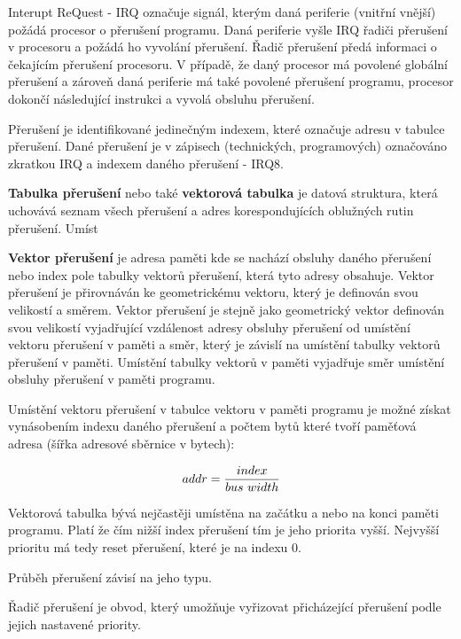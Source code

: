 Interupt ReQuest - IRQ označuje signál, kterým daná periferie (vnitřní vnější) požádá procesor o přerušení programu. Daná periferie vyšle IRQ řadiči přerušení v procesoru a požádá ho vyvolání přerušení. Řadič přerušení předá informaci o čekajícím přerušení procesoru. V případě, že daný procesor má povolené globální přerušení a zároveň daná periferie má také povolené přerušení programu, procesor dokončí následující instrukci a vyvolá obsluhu přerušení. 

Přerušení je identifikované jedinečným indexem, které označuje adresu v tabulce přerušení. Dané přerušení je v zápisech (technických, programových) označováno zkratkou IRQ a indexem daného přerušení - IRQ8.


{\bf Tabulka přerušení} nebo také {\bf vektorová tabulka} je datová struktura, která uchovává seznam všech přerušení a adres korespondujících oblužných rutin přerušení. Umíst

{\bf Vektor přerušení} je adresa paměti kde se nachází obsluhy daného přerušení nebo index pole tabulky vektorů přerušení, která tyto adresy obsahuje. Vektor přerušení je přirovnáván ke geometrickému vektoru, který je definován svou velikostí a směrem. Vektor přerušení je stejně jako geometrický vektor definován svou velikostí vyjadřující vzdálenost adresy obsluhy přerušení od umístění vektoru přerušení v paměti a směr, který je závislí na umístění tabulky vektorů přerušení v paměti. Umístění tabulky vektorů v paměti vyjadřuje směr umístění obsluhy přerušení v paměti programu.

Umístění vektoru přerušení v tabulce vektoru v paměti programu je možné získat vynásobením indexu daného přerušení a počtem bytů které tvoří paměťová adresa (šířka adresové sběrnice v bytech):
 
$$ addr = {index \over bus~width}$$


Vektorová tabulka bývá nejčastěji umístěna na začátku a nebo na konci paměti programu. Platí že čím nižší index přerušení tím je jeho priorita vyšší. Nejvyšší prioritu má tedy reset přerušení, které je na indexu 0.


Průběh přerušení závisí na jeho typu.


Řadič přerušení je obvod, který umožňuje vyřizovat přicházející přerušení podle jejich nastavené priority.

